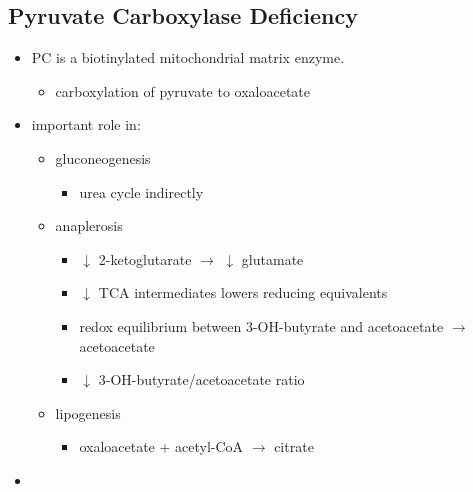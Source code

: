 \documentclass{scrartcl}
\begin{document}
\subsection{Pyruvate Carboxylase Deficiency}
\label{sec:org7cd82f0}
\begin{itemize}
\item PC is a biotinylated mitochondrial matrix enzyme.
\begin{itemize}
\item carboxylation of pyruvate to oxaloacetate
\end{itemize}


\item important role in:
\begin{itemize}
\item gluconeogenesis
\begin{itemize}
\item urea cycle indirectly
\end{itemize}
\item anaplerosis
\begin{itemize}
\item \(\downarrow\) 2-ketoglutarate \(\to\) \(\downarrow\) glutamate
\item \(\downarrow\) TCA intermediates lowers reducing equivalents
\item redox equilibrium between 3-OH-butyrate and acetoacetate \(\to\) acetoacetate
\item \(\downarrow\) 3-OH-butyrate/acetoacetate ratio
\end{itemize}
\item lipogenesis
\begin{itemize}
\item oxaloacetate + acetyl-CoA \(\to\) citrate
\end{itemize}
\end{itemize}
\item 
\end{itemize}
\end{document}
